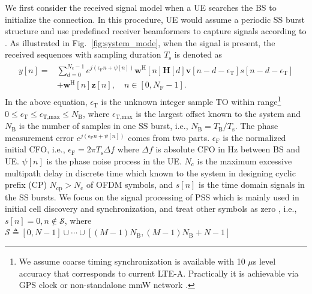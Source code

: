 \documentclass[journal]{IEEEtran}
\newcommand{\hermitian}[0]{\text{H}}
\newcommand{\CFO}[0]{\epsilon_{\text{F}}}
\newcommand{\STO}[0]{\epsilon_{\text{T}}}
\newcommand{\Ts}[0]{T_{\text{s}}}
\newcommand{\Tb}[0]{T_{\text{B}}}
\newcommand{\Nb}[0]{N_{\text{B}}}
\newcommand{\Nc}[0]{N_{\text{c}}}
\newcommand{\Ncp}[0]{N_{\text{cp}}}
\begin{document}
We first consider the received signal model when a UE searches the BS to initialize the connection. In this procedure, UE would assume a periodic SS burst structure and use predefined receiver beamformers to capture signals according to \cite{Giordani_beam_turotial_arxiv_1804}. As illustrated in Fig.~\ref{fig:system_mode}, when the signal is present, the received sequences with sampling duration $\Ts$ is denoted as
\begin{align}
\begin{split}
y[n] =  &\sum_{d=0}^{\Nc-1}e^{j(\CFO n+\psi[n])}\mathbf{w}^{\hermitian}[n]\mathbf{H}[d]\mathbf{v}[n-d-\epsilon_{\text{T}}]s[n-d-\epsilon_{\text{T}}]\\
&+ \mathbf{w}^{\hermitian}[n]\mathbf{z}[n],\quad  n\in [0,N_{\text{F}}-1].
\end{split}
\label{eq:rx_signal_raw}
\end{align}
In the above equation, $\STO$ is the unknown integer sample TO within range\footnote{We assume coarse timing synchronization is available with 10 $\mu$s level accuracy that corresponds to current LTE-A. Practically it is achievable via GPS clock or non-standalone mmW network \cite{Giordani_beam_turotial_arxiv_1804}.} $0\leq \STO \leq \epsilon_{\text{T,max}} \leq \Nb$, where $\epsilon_{\text{T,max}}$ is the largest offset known to the system and $\Nb$ is the number of samples in one SS burst, i.e., $N_{\text{B}}=\Tb/\Ts$. The phase measurement error $e^{j(\CFO n+\psi[n])}$ comes from two parts. $\CFO$ is the normalized initial CFO, i.e., $\CFO = 2\pi\Ts \Delta f$ where $\Delta f$ is absolute CFO in Hz between BS and UE. $\psi[n]$ is the phase noise process in the UE.
$\Nc$ is the maximum excessive multipath delay in discrete time which known to the system in designing cyclic prefix (CP) $\Ncp>\Nc$ of OFDM symbols, and $s[n]$ is the time domain signals in the SS bursts.
\color{black} We focus on the signal processing of PSS which is mainly used in initial cell discovery and synchronization, and treat other symbols as zero \cite{7161389}, i.e., $s[n]=0,n\notin \mathcal{S}$, where \color{black}
$\mathcal{S}\triangleq [0,N-1]\cup \cdots \cup [(M-1)\Nb,(M-1)\Nb+N-1]$
\end{document}
